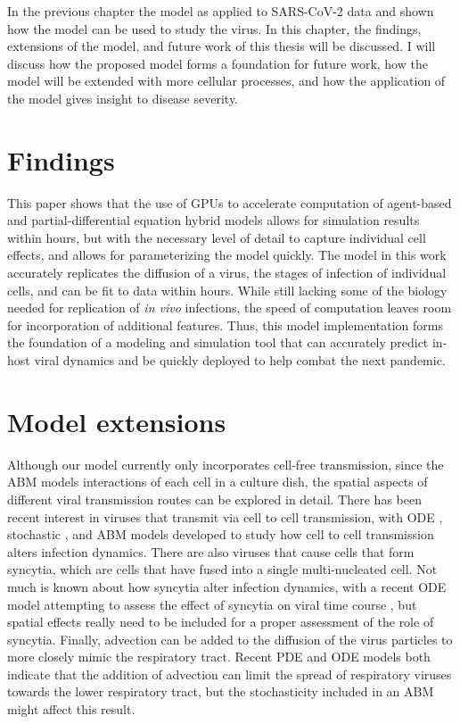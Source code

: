 In the previous chapter the model as applied to SARS-CoV-2 data and shown how the model can be used to study the virus. In this chapter, the findings, extensions of the model, and future work of this thesis will be discussed. I will discuss how the proposed model forms a foundation for future work, how the model will be extended with more cellular processes, and how the application of the model gives insight to disease severity.

\section{Findings}

This paper shows that the use of GPUs to accelerate computation of agent-based and partial-differential equation hybrid models allows for simulation results within hours, but with the necessary level of detail to capture individual cell effects, and allows for parameterizing the model quickly. The model in this work accurately replicates the diffusion of a virus, the stages of infection of individual cells, and can be fit to data within hours. While still lacking some of the biology needed for replication of \emph{in vivo} infections, the speed of computation leaves room for incorporation of additional features. Thus, this model implementation forms the foundation of a modeling and simulation tool that can accurately predict in-host viral dynamics and be quickly deployed to help combat the next pandemic.

\section{Model extensions}

Although our model currently only incorporates cell-free transmission, since the ABM models interactions of each cell in a culture dish, the spatial aspects of different viral transmission routes can be explored in detail. There has been recent interest in viruses that transmit via cell to cell transmission, with ODE \citep{allen15,komarova13,iwami15}, stochastic \citep{graw15}, and ABM \citep{kumberger18,blahut21} models developed to study how cell to cell transmission alters infection dynamics. There are also viruses that cause cells that form syncytia, which are cells that have fused into a single multi-nucleated cell. Not much is known about how syncytia alter infection dynamics, with a recent ODE model attempting to assess the effect of syncytia on viral time course \citep{jessie21}, but spatial effects really need to be included for a proper assessment of the role of syncytia. Finally, advection can be added to the diffusion of the virus particles to more closely mimic the respiratory tract. Recent PDE \citep{quirouette20} and ODE \citep{gonzalez19} models both indicate that the addition of advection can limit the spread of respiratory viruses towards the lower respiratory tract, but the stochasticity included in an ABM might affect this result. 

